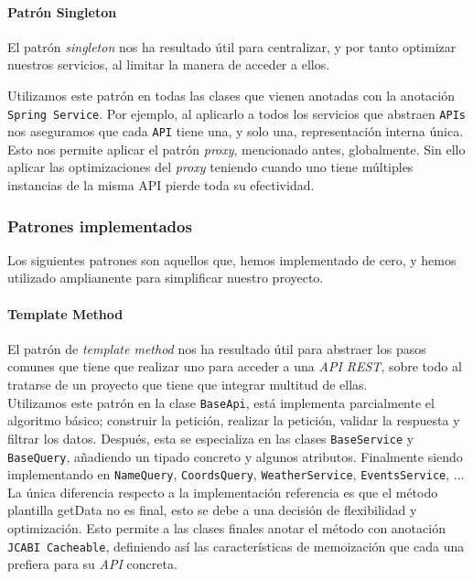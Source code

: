 \documentclass[../ei103948-project-documentation.tex]{subfiles}
\begin{document}
                        \paragraph{Patrón Singleton}
                        El patrón \textit{singleton} nos ha resultado útil para centralizar, y por tanto optimizar nuestros servicios, al limitar la manera de acceder a ellos.
            
                        Utilizamos este patrón en todas las clases que vienen anotadas con la anotación \texttt{Spring Service}. Por ejemplo, al aplicarlo a todos los servicios que abstraen \texttt{APIs} nos aseguramos que cada \texttt{API} tiene una, y solo una, representación interna única. Esto nos permite aplicar el patrón \textit{proxy}, mencionado antes, globalmente. Sin ello aplicar las optimizaciones del \textit{proxy} teniendo cuando uno tiene múltiples instancias de la misma API pierde toda su efectividad.
            
                    \subsubsection{Patrones implementados}
                    Los siguientes patrones son aquellos que, hemos implementado de cero, y hemos utilizado ampliamente para simplificar nuestro proyecto.
            
                        \paragraph{Template Method}
                        El patrón de \textit{template method} nos ha resultado útil para abstraer los pasos comunes que tiene que realizar uno para acceder a una \textit{API REST}, sobre todo al tratarse de un proyecto que tiene que integrar multitud de ellas.\\
            
                        Utilizamos este patrón en la clase \texttt{BaseApi}, está implementa parcialmente el algoritmo básico; construir la petición, realizar la petición, validar la respuesta y filtrar los datos. Después, esta se especializa en las clases \texttt{BaseService} y \texttt{BaseQuery}, añadiendo un tipado concreto y algunos atributos. Finalmente siendo implementando en \texttt{NameQuery}, \texttt{CoordsQuery}, \texttt{WeatherService}, \texttt{EventsService}, ...\\
            
                        La única diferencia respecto a la implementación referencia es que el método plantilla getData no es final, esto se debe a una decisión de flexibilidad y optimización. Esto permite a las clases finales anotar el método con anotación \texttt{JCABI Cacheable}, definiendo así las características de memoización que cada una prefiera para su \textit{API} concreta.\\
            
\end{document}
